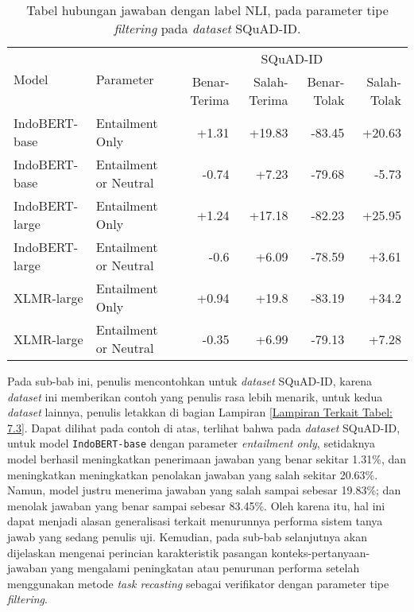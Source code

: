 \begin{table}[H]\centering
\footnotesize
\begin{tabular}{llrrrr}
\toprule
         \multirow{2}{*}{Model} &\multirow{2}{*}{Parameter} &\multicolumn{4}{c}{SQuAD-ID} \\\cmidrule{3-6}
& &Benar-Terima &Salah-Terima &Benar-Tolak &Salah-Tolak \\\midrule
 IndoBERT-base &       Entailment Only & +1.31 & +19.83 & -83.45 & +20.63 \\
 IndoBERT-base & Entailment or Neutral & -0.74 &  +7.23 & -79.68 &  -5.73 \\
\hline
IndoBERT-large &       Entailment Only & +1.24 & +17.18 & -82.23 & +25.95 \\
IndoBERT-large & Entailment or Neutral &  -0.6 &  +6.09 & -78.59 &  +3.61 \\
\hline
    XLMR-large &       Entailment Only & +0.94 &  +19.8 & -83.19 &  +34.2 \\
    XLMR-large & Entailment or Neutral & -0.35 &  +6.99 & -79.13 &  +7.28 \\
\bottomrule
\end{tabular}
\caption{Tabel hubungan jawaban dengan label NLI, pada parameter tipe \emph{filtering} pada \emph{dataset} SQuAD-ID.}
\end{table}

Pada sub-bab ini, penulis mencontohkan untuk \emph{dataset} SQuAD-ID, karena \emph{dataset} ini memberikan contoh yang penulis rasa lebih menarik, untuk kedua \emph{dataset} lainnya, penulis letakkan di bagian Lampiran \ref{Lampiran Terkait Tabel: 7.3}. Dapat dilihat pada contoh di atas, terlihat bahwa pada \emph{dataset} SQuAD-ID, untuk model \texttt{IndoBERT-base} dengan parameter \emph{entailment only}, setidaknya model berhasil meningkatkan penerimaan jawaban yang benar sekitar 1.31\%, dan meningkatkan meningkatkan penolakan  jawaban yang salah sekitar 20.63\%. Namun, model justru menerima jawaban yang salah sampai sebesar 19.83\%; dan menolak jawaban yang benar sampai sebesar 83.45\%. Oleh karena itu, hal ini dapat menjadi alasan generalisasi terkait menurunnya performa sistem tanya jawab yang sedang penulis uji. Kemudian, pada sub-bab selanjutnya akan dijelaskan mengenai perincian karakteristik pasangan konteks-pertanyaan-jawaban yang mengalami peningkatan atau penurunan performa setelah menggunakan metode \emph{task recasting} sebagai verifikator dengan parameter tipe \emph{filtering}.

